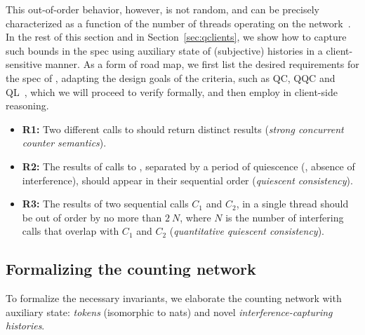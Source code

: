 \noindent

This out-of-order behavior, however, is not random, and can be
precisely characterized as a function of the number of threads
operating on the
network~\cite{Afek-al:OPODIS10,Jagadeesan-Riely:ICALP14}. In the rest
of this section and in Section~\ref{sec:qclients}, we show how to
capture such bounds in the spec using auxiliary state of (subjective)
histories in a client-sensitive manner. As a form of road map, we
first list the desired requirements for the spec of ,
%
adapting the design goals of the criteria, such as QC, QQC and
QL~\cite{Aspnes-al:JACM94,Afek-al:OPODIS10,Jagadeesan-Riely:ICALP14},
which we will proceed to verify formally, and then employ in
client-side reasoning.
%
\vspace{2pt}
\begin{itemize}

\item \textbf{R1:} Two different calls to 
  should return distinct results (\emph{strong concurrent
    counter semantics}).

\item \textbf{R2:} The results of calls to ,
  separated by a period of quiescence (\ie, absence of interference),
  should appear in their sequential order (\emph{quiescent
    consistency}).

\item \textbf{R3:} The results of two sequential calls $C_1$ and
  $C_2$, in a single thread should be out of order by no more than $2\
  N$, where $N$ is the number of interfering calls that overlap with
  $C_1$ and $C_2$ (\emph{quantitative quiescent consistency}).

\end{itemize}


\subsection{Formalizing the counting network}
\label{sec:counting-intuition}

To formalize the necessary invariants, we elaborate the counting
network with auxiliary state: \emph{tokens} (isomorphic to nats) and
novel \emph{interference-capturing histories}.

